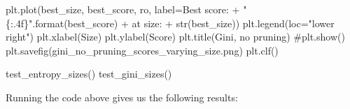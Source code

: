 \documentclass[
  letterpaper,
  DIV=11,
  numbers=noendperiod]{scrartcl}
\newenvironment{Shaded}{\begin{snugshade}}{\end{snugshade}}
\newcommand{\BuiltInTok}[1]{\textcolor[rgb]{0.00,0.23,0.31}{#1}}
\newcommand{\CommentTok}[1]{\textcolor[rgb]{0.37,0.37,0.37}{#1}}
\newcommand{\NormalTok}[1]{\textcolor[rgb]{0.00,0.23,0.31}{#1}}
\newcommand{\OperatorTok}[1]{\textcolor[rgb]{0.37,0.37,0.37}{#1}}
\newcommand{\SpecialCharTok}[1]{\textcolor[rgb]{0.37,0.37,0.37}{#1}}
\newcommand{\StringTok}[1]{\textcolor[rgb]{0.13,0.47,0.30}{#1}}
\begin{document}
\begin{Shaded}
\begin{Highlighting}[]
\NormalTok{    plt.plot(best\_size, best\_score, }\StringTok{\textquotesingle{}ro\textquotesingle{}}\NormalTok{, label}\OperatorTok{=}\StringTok{\textquotesingle{}Best score: \textquotesingle{}} 
        \OperatorTok{+} \StringTok{"}\SpecialCharTok{\{:.4f\}}\StringTok{"}\NormalTok{.}\BuiltInTok{format}\NormalTok{(best\_score) }\OperatorTok{+} \StringTok{\textquotesingle{} at size: \textquotesingle{}} \OperatorTok{+} \BuiltInTok{str}\NormalTok{(best\_size))}
\NormalTok{    plt.legend(loc}\OperatorTok{=}\StringTok{"lower right"}\NormalTok{)}
\NormalTok{    plt.xlabel(}\StringTok{\textquotesingle{}Size\textquotesingle{}}\NormalTok{)}
\NormalTok{    plt.ylabel(}\StringTok{\textquotesingle{}Score\textquotesingle{}}\NormalTok{)}
\NormalTok{    plt.title(}\StringTok{\textquotesingle{}Gini, no pruning\textquotesingle{}}\NormalTok{)}
    \CommentTok{\#plt.show()}
\NormalTok{    plt.savefig(}\StringTok{\textquotesingle{}gini\_no\_pruning\_scores\_varying\_size.png\textquotesingle{}}\NormalTok{)}
\NormalTok{    plt.clf()}

\NormalTok{test\_entropy\_sizes()}
\NormalTok{test\_gini\_sizes()}
\end{Highlighting}
\end{Shaded}

Running the code above gives us the following results:
\end{document}
